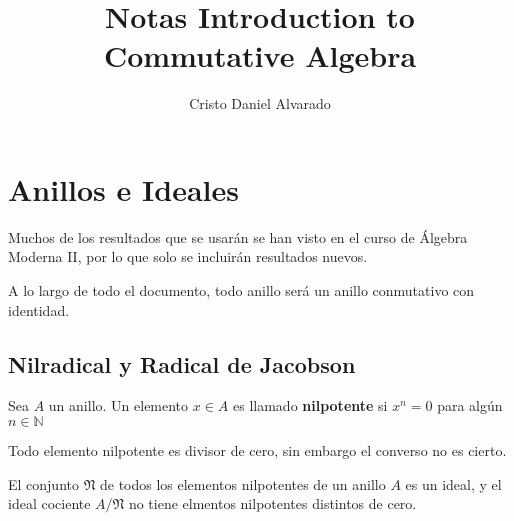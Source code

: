 \documentclass[12pt]{report}
\newcounter{it}
\theoremstyle{largebreak}
\begin{document}
    \setlength{\parskip}{5pt} %
    \setlength{\parindent}{12pt} %
    \title{Notas Introduction to Commutative Algebra}
    \author{Cristo Daniel Alvarado}
    \maketitle

    \tableofcontents %

    \chapter{Anillos e Ideales}

    Muchos de los resultados que se usarán se han visto en el curso de Álgebra Moderna II, por lo que solo se incluirán resultados nuevos.

    A lo largo de todo el documento, todo anillo será un anillo conmutativo con identidad.

  \section{Nilradical y Radical de Jacobson}

    \begin{mydef}
        Sea $A$ un anillo. Un elemento $x\in A$ es llamado \textbf{nilpotente} si $x^n=0$ para algún $n\in\mathbb{N}$
    \end{mydef}

    \begin{obs}
        Todo elemento nilpotente es divisor de cero, sin embargo el converso no es cierto.
    \end{obs}

    \begin{propo}
        El conjunto $\mathfrak{N}$ de todos los elementos nilpotentes de un anillo $A$ es un ideal, y el ideal cociente $A/\mathfrak{N}$ no tiene elmentos nilpotentes distintos de cero.
    \end{propo}
\end{document}
